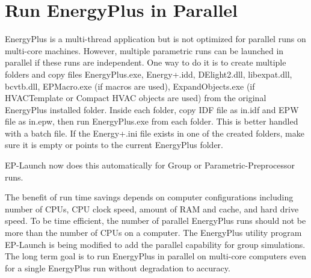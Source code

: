 \section{Run EnergyPlus in Parallel}\label{run-energyplus-in-parallel}

EnergyPlus is a multi-thread application but is not optimized for parallel runs on multi-core machines. However, multiple parametric runs can be launched in parallel if these runs are independent. One way to do it is to create multiple folders and copy files EnergyPlus.exe, Energy+.idd, DElight2.dll, libexpat.dll, bcvtb.dll, EPMacro.exe (if macros are used), ExpandObjects.exe (if HVACTemplate or Compact HVAC objects are used) from the original EnergyPlus installed folder. Inside each folder, copy IDF file as in.idf and EPW file as in.epw, then run EnergyPlus.exe from each folder. This is better handled with a batch file. If the Energy+.ini file exists in one of the created folders, make sure it is empty or points to the current EnergyPlus folder.

EP-Launch now does this automatically for Group or Parametric-Preprocessor runs.

The benefit of run time savings depends on computer configurations including number of CPUs, CPU clock speed, amount of RAM and cache, and hard drive speed. To be time efficient, the number of parallel EnergyPlus runs should not be more than the number of CPUs on a computer. The EnergyPlus utility program EP-Launch is being modified to add the parallel capability for group simulations. The long term goal is to run EnergyPlus in parallel on multi-core computers even for a single EnergyPlus run without degradation to accuracy.

